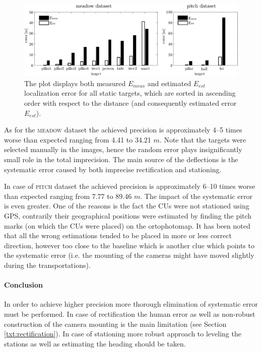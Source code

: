 \begin{figure}[htb]\centering
	\centering
	\includegraphics[width=0.98\linewidth]{fig/plot_static_targets.pdf}
	\caption{The plot displays both measured $E_{meas}$ and estimated $E_{est}$ localization error for all static targets, which are sorted in ascending order with respect to the distance (and consequently estimated error $E_{est}$).}
	\label{fig:plot_error_estatic_targets}
\end{figure}

As for the \textsc{meadow} dataset the achieved precision is approximately 4--5 times worse than expected ranging from 4.41 to 34.21 $m$. Note that the targets were selected manually in the images, hence the random error plays insignificantly small role in the total imprecision. The main source of the deflections is the systematic error caused by both imprecise rectification and stationing. 

In case of \textsc{pitch} dataset the achieved precision is approximately 6--10 times worse than expected ranging from 7.77 to 89.46 $m$. The impact of the systematic error is even greater. One of the reasons is the fact the CUs were not stationed using GPS, contrarily their geographical positions were estimated by finding the pitch marks (on which the CUs were placed) on the ortophotomap. It has been noted that all the wrong estimations tended to be placed in more or less correct direction, however too close to the baseline which is another clue which points to the systematic error (i.e. the mounting of the cameras might have moved slightly during the transportations).

\paragraph{Conclusion} In order to achieve higher precision more thorough elimination of systematic error must be performed. In case of rectification the human error as well as non-robust construction of the camera mounting is the main limitation (see Section \ref{txt:rectification}). In case of stationing more robust approach to leveling the stations as well as estimating the heading should be taken.

